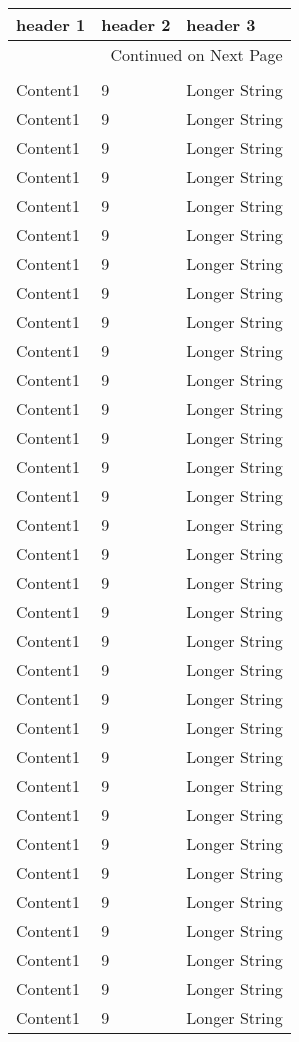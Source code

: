 \documentclass{article}%
\begin{document}
%
\begin{longtable}{l l l}%
\hline%
header 1&header 2&header 3\\%
\hline%
\endhead%
\hline%
\multicolumn{3}{r}{Continued on Next Page}\\%
\hline%
\endfoot%
\hline%
\multicolumn{3}{r}{Not Continued on Next Page}\\%
\hline%
\endlastfoot%
Content1&9&Longer String\\%
Content1&9&Longer String\\%
Content1&9&Longer String\\%
Content1&9&Longer String\\%
Content1&9&Longer String\\%
Content1&9&Longer String\\%
Content1&9&Longer String\\%
Content1&9&Longer String\\%
Content1&9&Longer String\\%
Content1&9&Longer String\\%
Content1&9&Longer String\\%
Content1&9&Longer String\\%
Content1&9&Longer String\\%
Content1&9&Longer String\\%
Content1&9&Longer String\\%
Content1&9&Longer String\\%
Content1&9&Longer String\\%
Content1&9&Longer String\\%
Content1&9&Longer String\\%
Content1&9&Longer String\\%
Content1&9&Longer String\\%
Content1&9&Longer String\\%
Content1&9&Longer String\\%
Content1&9&Longer String\\%
Content1&9&Longer String\\%
Content1&9&Longer String\\%
Content1&9&Longer String\\%
Content1&9&Longer String\\%
Content1&9&Longer String\\%
Content1&9&Longer String\\%
Content1&9&Longer String\\%
Content1&9&Longer String\\%
Content1&9&Longer String\\%

\end{longtable}
\end{document}

